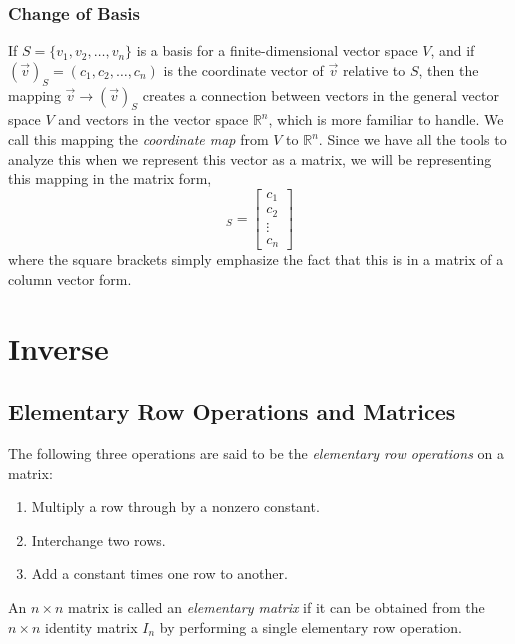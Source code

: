 \documentclass{report}
\begin{document}
	\subsubsection{Change of Basis}
	If $S=\{v_1,v_2,\dots,v_n\}$ is a basis for a finite-dimensional vector space $V$, and if $(\vec{v})_S=(c_1,c_2,\dots,c_n)$ is the coordinate vector of $\vec{v}$ relative to $S$, then the mapping $\vec{v} \rightarrow (\vec{v})_S$ creates a connection between vectors in the general vector space $V$ and vectors in the vector space $\mathbb{R}^n$, which is more familiar to handle. We call this mapping the \emph{coordinate map} from $V$ to $\mathbb{R}^n$. Since we have all the tools to analyze this when we represent this vector as a matrix, we will be representing this mapping in the matrix form,
	\begin{displaymath}
	[\bf{v}]_S=\begin{bmatrix} c_1 \\ c_2 \\ \vdots \\ c_n \end{bmatrix}
	\end{displaymath}
	where the square brackets simply emphasize the fact that this is in a matrix of a column vector form.%

	\section{Inverse}
		\subsection{Elementary Row Operations and Matrices}
		
		\begin{defn}\label{def_elementary_row_operations}
			The following three operations are said to be the \emph{elementary row operations} on a matrix:
			\begin{enumerate}
				\item Multiply a row through by a nonzero constant.
				\item Interchange two rows.
				\item Add a constant times one row to another.
			\end{enumerate}
		\end{defn}
		
		\begin{defn}
			An $n \times n$ matrix is called an \emph{elementary matrix} if it can be obtained from the $n \times n$ identity matrix $I_n$ by performing a single elementary row operation.
		\end{defn}
		
\end{document}
